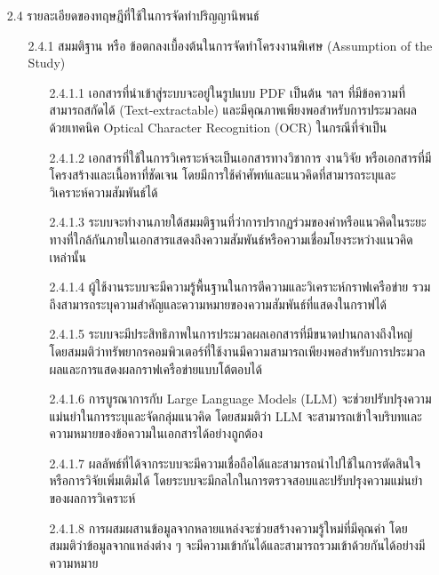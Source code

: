 \documentclass[12pt,a4paper]{article}
\newcommand{\textlight}[1]{{\thailightfont #1}}
\begin{document}
\begin{enumerate}[leftmargin=2cm]
    \item[2.4] รายละเอียดของทฤษฎีที่ใช้ในการจัดทำปริญญานิพนธ์
    \vspace{0.05cm}
    \textlight{
        \begin{enumerate}
            \item[2.4.1] สมมติฐาน หรือ ข้อตกลงเบื้องต้นในการจัดทำโครงงานพิเศษ (Assumption of the Study)
            \vspace{0.05cm}
            \begin{enumerate}
                \item[2.4.1.1] เอกสารที่นำเข้าสู่ระบบจะอยู่ในรูปแบบ PDF เป็นต้น ฯลฯ ที่มีข้อความที่สามารถสกัดได้ (Text-extractable) และมีคุณภาพเพียงพอสำหรับการประมวลผลด้วยเทคนิค Optical Character Recognition (OCR) ในกรณีที่จำเป็น
                \item[2.4.1.2] เอกสารที่ใช้ในการวิเคราะห์จะเป็นเอกสารทางวิชาการ งานวิจัย หรือเอกสารที่มีโครงสร้างและเนื้อหาที่ชัดเจน โดยมีการใช้คำศัพท์และแนวคิดที่สามารถระบุและวิเคราะห์ความสัมพันธ์ได้
                \item[2.4.1.3] ระบบจะทำงานภายใต้สมมติฐานที่ว่าการปรากฏร่วมของคำหรือแนวคิดในระยะทางที่ใกล้กันภายในเอกสารแสดงถึงความสัมพันธ์หรือความเชื่อมโยงระหว่างแนวคิดเหล่านั้น
                \item[2.4.1.4] ผู้ใช้งานระบบจะมีความรู้พื้นฐานในการตีความและวิเคราะห์กราฟเครือข่าย รวมถึงสามารถระบุความสำคัญและความหมายของความสัมพันธ์ที่แสดงในกราฟได้
                \item[2.4.1.5] ระบบจะมีประสิทธิภาพในการประมวลผลเอกสารที่มีขนาดปานกลางถึงใหญ่ โดยสมมติว่าทรัพยากรคอมพิวเตอร์ที่ใช้งานมีความสามารถเพียงพอสำหรับการประมวลผลและการแสดงผลกราฟเครือข่ายแบบโต้ตอบได้
                \item[2.4.1.6] การบูรณาการกับ Large Language Models (LLM) จะช่วยปรับปรุงความแม่นยำในการระบุและจัดกลุ่มแนวคิด โดยสมมติว่า LLM จะสามารถเข้าใจบริบทและความหมายของข้อความในเอกสารได้อย่างถูกต้อง
                \item[2.4.1.7] ผลลัพธ์ที่ได้จากระบบจะมีความเชื่อถือได้และสามารถนำไปใช้ในการตัดสินใจหรือการวิจัยเพิ่มเติมได้ โดยระบบจะมีกลไกในการตรวจสอบและปรับปรุงความแม่นยำของผลการวิเคราะห์
                \item[2.4.1.8] การผสมผสานข้อมูลจากหลายแหล่งจะช่วยสร้างความรู้ใหม่ที่มีคุณค่า โดยสมมติว่าข้อมูลจากแหล่งต่าง ๆ จะมีความเข้ากันได้และสามารถรวมเข้าด้วยกันได้อย่างมีความหมาย
            \end{enumerate}


\end{enumerate}}
\end{enumerate}
\end{document}
